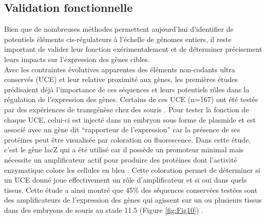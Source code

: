 \subsection{Validation fonctionnelle}
\label{subsec:validation}

Bien que de nombreuses méthodes permettent aujourd’hui d’identifier de potentiels éléments \gls{cis}-régulateurs à l’échelle de génomes entiers, il reste important de valider leur fonction exérimentalement et de déterminer précisement leurs impacts sur l’expression des gènes cibles. \\

Avec les contraintes évolutives apparentes des éléments non-codants ultra conservés (UCE) et leur relative proximité aux gènes, les premières études prédisaient déjà l’importance de ces séquences et leurs potentiels rôles dans la régulation de l’expression des gènes. Certains de ces UCE (n=167) ont été testés par des expériences de transgénèse chez des souris \citep{pennacchio_vivo_2006}. Pour tester la fonction de chaque UCE, celui-ci est injecté dans un embryon sous forme de plasmide et est associé avec un gène dit “rapporteur de l’expression” car la présence de ses protéines peut être visualisée par coloration ou fluorescence. Dans cette étude, c’est le gène lacZ qui a été utilisé car il possède un promoteur minimal mais nécessite un \gls{amplificateur} actif pour produire des protéines dont l’activité enzymatique colore les cellules en bleu \citep{li_overview_2018}. Cette coloration permet de déterminer si un UCE donné joue effectivement un rôle d’\gls{amplificateur} et si oui dans quels tissus. Cette étude a ainsi montré que 45\% des séquences conservées testées sont des \glspl{amplificateur} de l’expression des gènes qui agissent sur un ou plusieurs tissus dans des embryons de souris au stade 11.5 (Figure \ref{fig:Fig10}) \citep{pennacchio_vivo_2006}. 


